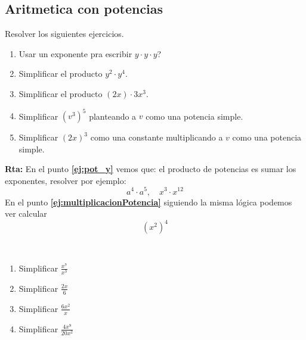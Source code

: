 \subsection{Aritmetica con potencias}
\begin{ejemplo}
	Resolver los siguientes ejercicios. 
	\begin{enumerate}[label=\Alph*)]
		\item Usar un exponente pra escribir $y\cdot y\cdot y$?
		
		\item \label{ej:pot_y}Simplificar el producto $y^2 \cdot y^4$.
		
		\item Simplificar el producto $(2x) \cdot 3x^3$.
		
		\item \label{ej:multiplicacionPotencia}Simplificar ${(v^3)}^5$ planteando a $v$ como una potencia simple.
		
		\item Simplificar ${(2x)}^3$ como una constante multiplicando a $v$ como una potencia simple.
	\end{enumerate}
	
	\textbf{Rta:} En el punto \textbf{\ref{ej:pot_y}} vemos que: el producto de potencias es sumar los exponentes, resolver por ejemplo:
	\[ a^4 \cdot a^5,\quad x^3\cdot x^{12}\]
	En el punto \textbf{\ref{ej:multiplicacionPotencia}} siguiendo la misma lógica podemos ver calcular
	\[{(x^2)}^4\]
\end{ejemplo}

\begin{exer}{\ \\}
	\begin{multicols}{2}
		\begin{enumerate}[label=\Alph*)]
			\item Simplificar $\frac{x^7}{x^3}$
			\item Simplificar $\frac{2x}{6}$
			\item Simplificar $\frac{6x^2}{x}$
			\item Simplificar $\frac{4x^9}{20x^2}$
		\end{enumerate}
	\end{multicols}
\end{exer}

